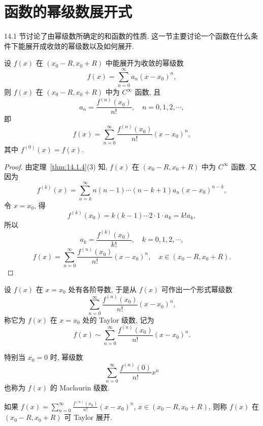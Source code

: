\section{函数的幂级数展开式}\label{sec:14.2}

14.1 节讨论了由幂级数所确定的和函数的性质. 这一节主要讨论一个函数在什么条件下能展开成收敛的幂级数以及如何展开.

\begin{theorem}[幂级数展开的惟一性]\label{thm:14.2.1}
设 $f(x)$ 在 $(x_{0}-R,x_{0}+R)$ 中能展开为收敛的幂级数
\[
  f(x)=\sum_{n=0}^{\infty}a_{n}(x-x_{0})^{n},
\]
则 $f(x)$ 在 $(x_{0}-R,x_{0}+R)$ 中为 $C^{\infty}$ 函数, 且
\[
  a_{n}=\frac{f^{(n)}(x_{0})}{n!},\quad n=0,1,2,\cdots,
\]
即
\[
  f(x)=\sum_{n=0}^{\infty}\frac{f^{(n)}(x_{0})}{n!}(x-x_{0})^{n},
\]
其中 $f^{(0)}(x)=f(x)$.
\end{theorem}

\begin{proof}
由定理~\ref{thm:14.1.4}(3) 知, $f(x)$ 在 $(x_{0}-R,x_{0}+R)$ 中为 $C^{\infty}$ 函数. 又因为
\[
  f^{(k)}(x)=\sum_{n=k}^{\infty}n(n-1)\cdots(n-k+1)a_{n}(x-x_{0})^{n-k},
\]
令 $x=x_{0}$, 得
\[
  f^{(k)}(x_{0})=k(k-1)\cdots2\cdot1\cdot a_{k}=k!a_{k},
\]
所以
\[
  a_{k}=\frac{f^{(k)}(x_{0})}{k!},\quad k=0,1,2,\cdots,
\]
\[
  f(x)=\sum_{n=0}^{\infty}\frac{f^{(n)}(x_{0})}{n!}(x-x_{0})^{n},\quad x\in(x_{0}-R,x_{0}+R).
\]
\end{proof}

\begin{definition}\label{def:14.2.1}
设 $f(x)$ 在 $x=x_{0}$ 处有各阶导数, 于是从 $f(x)$ 可作出一个形式幂级数
\[
  \sum_{n=0}^{\infty}\frac{f^{(n)}(x_{0})}{n!}(x-x_{0})^{n},
\]
称它为 $f(x)$ 在 $x=x_{0}$ 处的 Taylor 级数, 记为
\[
  f(x)\sim\sum_{n=0}^{\infty}\frac{f^{(n)}(x_{0})}{n!}(x-x_{0})^{n}.
\]
\end{definition}

特别当 $x_{0}=0$ 时, 幂级数
\[
  \sum_{n=0}^{\infty}\frac{f^{(n)}(0)}{n!}x^{n}
\]
也称为 $f(x)$ 的 Maclaurin 级数.

如果 $f(x)=\sum_{n=0}^{\infty}\frac{f^{(n)}(x_{0})}{n!}(x-x_{0})^{n}$, $x\in(x_{0}-R,x_{0}+R)$, 则称 $f(x)$ 在 $(x_{0}-R,x_{0}+R)$ 可 Taylor 展开.

